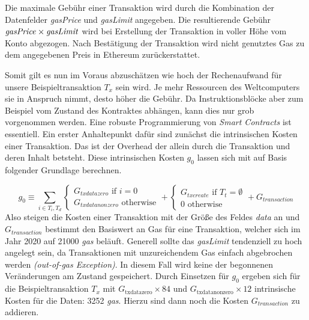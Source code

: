 \documentclass[runningheads]{llncs}
\begin{document}
Die maximale Gebühr einer Transaktion wird durch die Kombination der Datenfelder \textit{gasPrice} und \textit{gasLimit} angegeben. Die resultierende Gebühr $ \text{\textit{gasPrice}} \times \text{\textit{gasLimit}} $ wird bei Erstellung der Transaktion in voller Höhe vom Konto abgezogen. Nach Bestätigung der Transaktion wird nicht genutztes Gas zu dem angegebenen Preis in Ethereum zurückerstattet.

Somit gilt es nun im Voraus abzuschätzen wie hoch der Rechenaufwand für unsere Beispieltransaktion $ T_x $ sein wird. Je mehr Ressourcen des Weltcomputers sie in Anspruch nimmt, desto höher die Gebühr. Da Instruktionsblöcke aber zum Beispiel vom Zustand des Kontraktes abhängen, kann dies nur grob vorgenommen werden. Eine robuste Programmierung von \textit{Smart Contracts} ist essentiell. Ein erster Anhaltepunkt dafür sind zunächst die intrinsischen Kosten einer Transaktion. Das ist der Overhead der allein durch die Transaktion und deren Inhalt betsteht. Diese intrinsischen Kosten $ g_0 $ lassen sich mit auf Basis folgender Grundlage berechnen.

$$ g_0 \equiv \sum_{i \in T_i, T_d}
  \begin{cases}
    G_{txdatazero} \text{ if } i=0 \\
    G_{txdatanonzero} \text{ otherwise}
  \end{cases}
  +
  \begin{cases}
    G_{txcreate} \text{ if } T_t = \emptyset \\
    0 \text{ otherwise}
  \end{cases}
  +
  G_{transaction}
$$
Also steigen die Kosten einer Transaktion mit der Größe des Feldes \textit{data} an und $ G_{transaction} $ bestimmt den Basiswert an Gas für eine Transaktion, welcher sich im Jahr 2020 auf 21000 \textit{gas} beläuft. Generell sollte das \textit{gasLimit} tendenziell zu hoch angelegt sein, da Transaktionen mit unzureichendem Gas einfach abgebrochen werden \textit{(out-of-gas Exception)}. In diesem Fall wird keine der begonnenen Veränderungen am Zustand gespeichert. Durch Einsetzen für $ g_0 $ ergeben sich für die Beispieltransaktion $ T_x $ mit $ G_{\text{txdatazero}} \times 84 $ und $ G_{\text{txdatanonzero}} \times 12 $ intrinsische Kosten für die Daten: 3252 \textit{gas}. Hierzu sind dann noch die Kosten $ G_{transaction} $ zu addieren. \cite{neemann_appendix_nodate}
\end{document}
